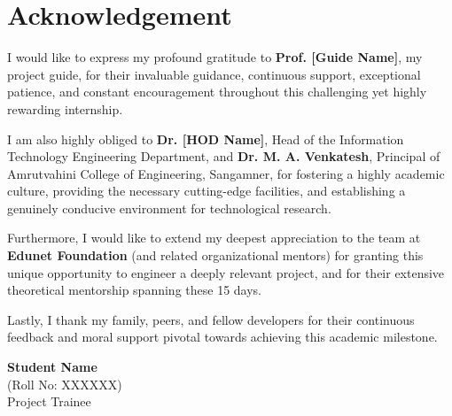 \documentclass[12pt,a4paper]{report}
\begin{document}
\chapter*{Acknowledgement}

I would like to express my profound gratitude to \textbf{Prof. [Guide Name]}, my project guide, for their invaluable guidance, continuous support, exceptional patience, and constant encouragement throughout this challenging yet highly rewarding internship.

I am also highly obliged to \textbf{Dr. [HOD Name]}, Head of the Information Technology Engineering Department, and \textbf{Dr. M. A. Venkatesh}, Principal of Amrutvahini College of Engineering, Sangamner, for fostering a highly academic culture, providing the necessary cutting-edge facilities, and establishing a genuinely conducive environment for technological research.

Furthermore, I would like to extend my deepest appreciation to the team at \textbf{Edunet Foundation} (and related organizational mentors) for granting this unique opportunity to engineer a deeply relevant project, and for their extensive theoretical mentorship spanning these 15 days.

Lastly, I thank my family, peers, and fellow developers for their continuous feedback and moral support pivotal towards achieving this academic milestone.

\vspace{3cm}
\begin{flushright}
    \textbf{Student Name} \\
    (Roll No: XXXXXX) \\
    Project Trainee
\end{flushright}
\end{document}
